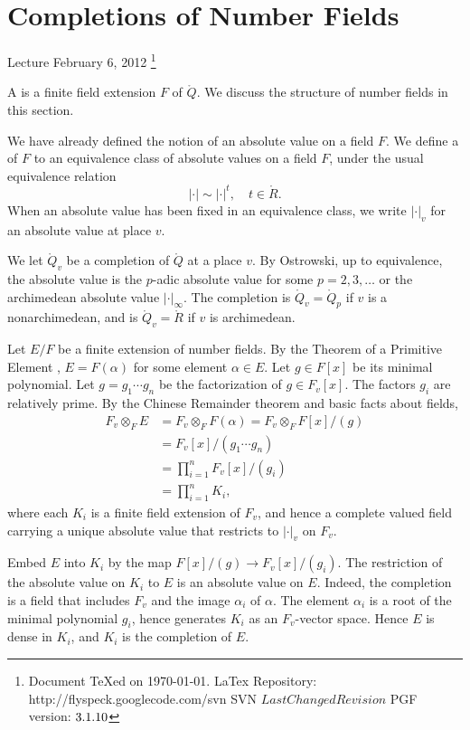 \documentclass{amsart}
\def\abs#1{{|#1|}}
\def\RR{\ring{R}}
\def\svninfo{%
  \noindent
  Document TeXed on \today. \hfill\break
  LaTex Repository: http://flyspeck.googlecode.com/svn \hfill\break
  SVN $LastChangedRevision$\hfill\break
  PGF version: $\pgftypesetversion$
  }
\begin{document}
\newpage

\section{Completions of Number Fields}\label{sec:number fields}

Lecture February 6, 2012
\footnote{\svninfo}

A  is a finite field extension $F$ of
$\ring{Q}$.  We discuss the structure of number fields in this
section.  

We have already defined the notion of an absolute value on a field
$F$.  We define a  of $F$ to an equivalence class of
absolute values on a field $F$, under the usual equivalence relation
\[
\abs{\cdot} \sim \abs{\cdot}^t,\quad t\in\RR.
\]
When an absolute value has been fixed in an equivalence class, we write
$\abs{\cdot}_v$ for an absolute value at place $v$.

We let $\ring{Q}_v$ be a completion of $\ring{Q}$ at a place $v$.
By Ostrowski, up to equivalence, the absolute value is the $p$-adic
absolute value for some  $p=2,3,\ldots$ or the
archimedean absolute value $\abs{\cdot}_\infty$.  The completion
is $\ring{Q}_v = \ring{Q}_p$ if $v$ is a nonarchimedean, and is
$\ring{Q}_v=\RR$ if $v$ is archimedean.


Let $E/F$ be a finite extension of number fields.
By the Theorem of a Primitive Element \cite[Th.~9.34]{knapp-basic}, 
 $E = F(\alpha)$ for some element $\alpha\in E$.
Let $g\in F[x]$ be its minimal polynomial.
Let $g = g_1\cdots g_n$ be the factorization of $g \in F_v[x]$.
The factors
$g_i$ are relatively prime.
By the Chinese Remainder theorem and basic facts about fields,
\begin{align*}
F_v\otimes_F E &= F_v\otimes_F F(\alpha) = 
   F_v\otimes_F F[x]/(g) \\
&= F_v[x]/(g_1\cdots g_n)\\
&= \prod_{i=1}^n F_v[x]/(g_i)\\
&= \prod_{i=1}^n K_i,
\end{align*}
where each $K_i$ is a finite field extension of $F_v$, 
and hence a complete valued field carrying a unique absolute
value that restricts to $\abs{\cdot}_v$ on $F_v$.

Embed $E$ into $K_i$ by the map $F[x]/(g)\to F_v[x]/(g_i)$.  The
restriction of the absolute value on $K_i$ to $E$ is an absolute value
on $E$.    Indeed, the completion is a field
that includes $F_v$ and the image $\alpha_i$ of $\alpha$.  The element
$\alpha_i$ is a root of the minimal polynomial $g_i$, hence generates
$K_i$ as an $F_v$-vector space.  Hence $E$ is dense in $K_i$, and $K_i$
is the completion of $E$.
\end{document}
